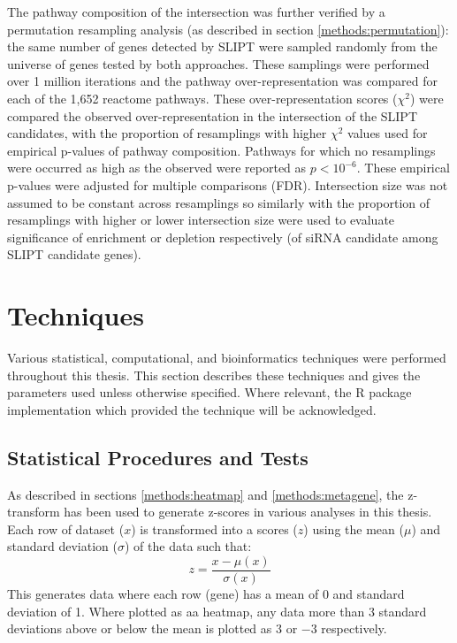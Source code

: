 The pathway composition of the intersection was further verified by a permutation resampling analysis (as described in section \ref{methods:permutation}): the same number of genes detected by SLIPT were sampled randomly from the universe of genes tested by both approaches. These samplings were performed over 1 million iterations and the pathway over-representation was compared for each of the 1,652 reactome pathways.
These over-representation scores ($\chi^2$) were compared the observed over-representation in the intersection of the SLIPT candidates, with the proportion of resamplings with higher $\chi^2$ values used for empirical p-values of pathway composition. Pathways for which no resamplings were occurred as high as the observed were reported as $p < 10^{-6}$. These empirical p-values were adjusted for multiple comparisons (FDR). Intersection size was not assumed to be constant across resamplings so similarly with the proportion of resamplings with higher or lower intersection size were used to evaluate significance of enrichment or depletion respectively (of siRNA candidate among SLIPT candidate genes).  

\section{Techniques}
Various statistical, computational, and bioinformatics techniques were performed throughout this thesis. This section describes these techniques and gives the parameters used unless otherwise specified. Where relevant, the R package implementation which provided the technique will be acknowledged. 

\subsection{Statistical Procedures and Tests}

As described in sections \ref{methods:heatmap} and \ref{methods:metagene}, the z-transform has been used to generate z-scores in various analyses in this thesis. Each row of dataset ($x$) is transformed into a scores ($z$) using the mean ($\mu$) and standard deviation ($\sigma$) of the data such that: $$ z = \frac{x - \mu(x)}{\sigma(x)} $$
This generates data where each row (gene) has a mean of 0 and standard deviation of 1. Where plotted as aa heatmap, any data more than 3 standard deviations above or below the mean is plotted as $3$ or $-3$ respectively.

